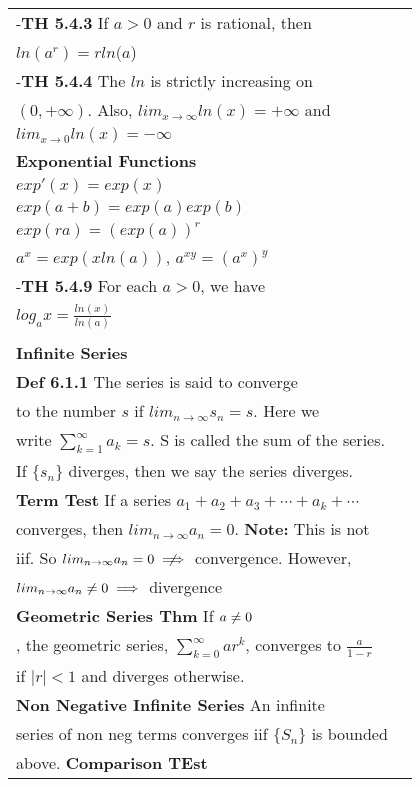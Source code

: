 \documentclass[10 pt,landscape]{article}
\begin{document}
\begin{multicols}{4}
\begin{tabular}{@{}ll@{}}
-\textbf{TH 5.4.3} If $a>0$ and $r$ is rational, then\\ $ln(a^r)=rln(a$)\\
-\textbf{TH 5.4.4} The $ln$ is strictly increasing on\\ $(0, +\infty)$. Also, $lim_{x \to \infty}ln(x)=+\infty$ and\\ $lim_{x \to 0}ln(x)=-\infty$\\
\textbf{Exponential Functions} \\$exp'(x)=exp(x)$\\$exp(a+b)=exp(a)exp(b)$\\$exp(ra)=(exp(a))^r$\\
$a^x=exp(xln(a))$, $a^{xy}=(a^x)^y$\\
-\textbf{TH 5.4.9} For each $a>0$, we have \\ $log_ax=\frac{ln(x)}{ln(a)}$\\
\\
\textbf{Infinite Series}\\
\textbf{Def 6.1.1} The series is said to converge\\to the number $s$ if $lim_{n \to \infty}s_n = s$. Here we\\ write $\sum_{k=1}^{\infty} a_k = s$.  S is called the sum of the series.\\  If $\{s_n\}$ diverges, then we say the series diverges.\\
\textbf{Term Test} If a series $a_1+a_2+a_3+\cdots+a_k+\cdots$\\ converges, then $lim_{n \to \infty}a_n = 0$.  \textbf{Note:} This is not\\ iif.  So $lim_{n \to \infty}a_n = 0 \centernot\implies$ convergence.  However,\\ $lim_{n \to \infty}a_n \centernot = 0 \implies$ divergence\\
\textbf{Geometric Series Thm} If $a \centernot = 0$\\, the geometric series, $\sum_{k=0}^{\infty} ar^k$, converges to $\frac{a}{1-r}$\\if $|r| < 1$ and diverges otherwise.\\
\textbf{Non Negative Infinite Series} An infinite\\series of non neg terms converges iif $\{S_n\}$ is bounded\\ above.
\textbf{Comparison TEst}


\end{tabular}


\end{multicols}
\end{document}
